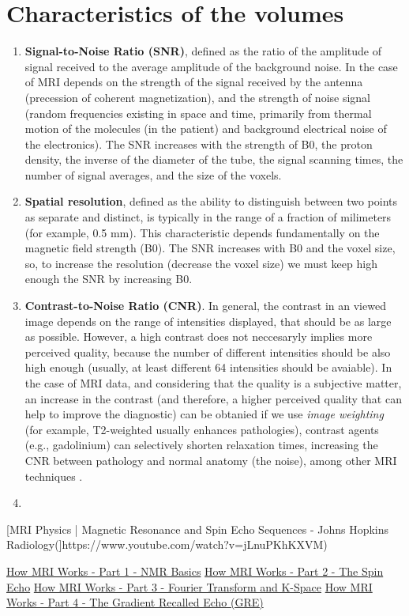 \section{Characteristics of the volumes}
\begin{enumerate}
\item \textbf{Signal-to-Noise Ratio (SNR)}, defined as the ratio of
  the amplitude of signal received to the average amplitude of the
  background noise. In the case of MRI depends on the strength of the
  signal received by the antenna (precession of coherent
  magnetization), and the strength of noise signal (random frequencies
  existing in space and time, primarily from thermal motion of the
  molecules (in the patient) and background electrical noise of the
  electronics). The SNR increases with the strength of B0, the proton
  density, the inverse of the diameter of the tube, the signal
  scanning times, the number of signal averages, and the size of the
  voxels.
\item \textbf{Spatial resolution}, defined as the ability to
  distinguish between two points as separate and distinct, is
  typically in the range of a fraction of milimeters (for example, 0.5
  mm). This characteristic depends fundamentally on the magnetic field
  strength (B0). The SNR increases with B0 and the voxel size, so, to
  increase the resolution (decrease the voxel size) we must keep high
  enough the SNR by increasing B0.
\item \textbf{Contrast-to-Noise Ratio (CNR)}. In general, the contrast
  in an viewed image depends on the range of intensities displayed,
  that should be as large as possible. However, a high contrast does
  not neccesaryly implies more perceived quality, because the number
  of different intensities should be also high enough (usually, at
  least different 64 intensities should be avaiable). In the case of
  MRI data, and considering that the quality is a subjective matter,
  an increase in the contrast (and therefore, a higher perceived
  quality that can help to improve the diagnostic) can be obtanied if
  we use \emph{image weighting} (for example, T2-weighted usually
  enhances pathologies), contrast agents (e.g., gadolinium) can
  selectively shorten relaxation times, increasing the CNR between
  pathology and normal anatomy (the noise), among other MRI techniques
  \cite{westbrook2018mri}.
\item 
\end{enumerate}

[MRI Physics | Magnetic Resonance and Spin Echo Sequences - Johns Hopkins Radiology(]https://www.youtube.com/watch?v=jLnuPKhKXVM)

\href{https://www.youtube.com/watch?v=TQegSF4ZiIQ}{How MRI Works - Part 1 - NMR Basics}
\href{https://www.youtube.com/watch?v=M7yh0To6Wbs}{How MRI Works - Part 2 - The Spin Echo}
\href{https://www.youtube.com/watch?v=R_4GuyJTzMo}{How MRI Works - Part 3 - Fourier Transform and K-Space}
\href{https://www.youtube.com/watch?v=vapJRr6gAds}{How MRI Works - Part 4 - The Gradient Recalled Echo (GRE)}